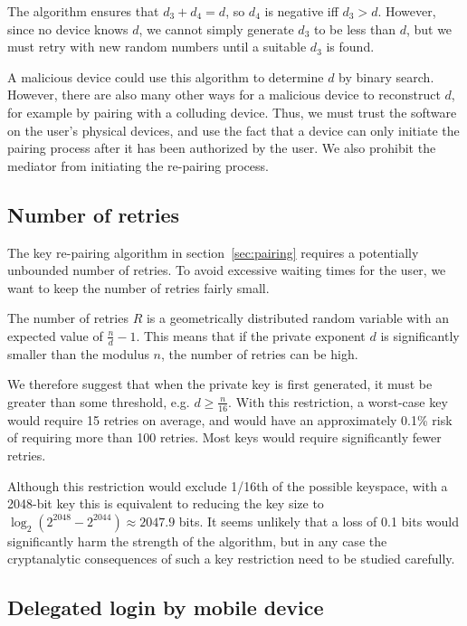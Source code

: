 The algorithm ensures that $d_3 + d_4 = d$, so $d_4$ is negative iff $d_3 > d$. However, since no
device knows $d$, we cannot simply generate $d_3$ to be less than $d$, but we must retry with new
random numbers until a suitable $d_3$ is found.

A malicious device could use this algorithm to determine $d$ by binary search. However, there are
also many other ways for a malicious device to reconstruct $d$, for example by pairing with a
colluding device. Thus, we must trust the software on the user's physical devices, and use the fact
that a device can only initiate the pairing process after it has been authorized by the user. We
also prohibit the mediator from initiating the re-pairing process.

\subsection{Number of retries}\label{sec:retries}

The key re-pairing algorithm in section~\ref{sec:pairing} requires a potentially unbounded
number of retries. To avoid excessive waiting times for the user, we want to keep the number of
retries fairly small.

The number of retries $R$ is a geometrically distributed random variable with an expected value of
$\frac{n}{d}-1$. This means that if the private exponent $d$ is significantly smaller than the
modulus $n$, the number of retries can be high.

We therefore suggest that when the private key is first generated, it must be greater than some
threshold, e.g. $d \ge \frac{n}{16}$. With this restriction, a worst-case key would require 15
retries on average, and would have an approximately 0.1\% risk of requiring more than 100 retries.
Most keys would require significantly fewer retries.

Although this restriction would exclude 1/16th of the possible keyspace, with a 2048-bit key this is
equivalent to reducing the key size to $\log_2(2^{2048} - 2^{2044}) \approx 2047.9$ bits. It seems
unlikely that a loss of 0.1 bits would significantly harm the strength of the algorithm, but in any
case the cryptanalytic consequences of such a key restriction need to be studied carefully.

\subsection{Delegated login by mobile device}\label{sec:delegation}

